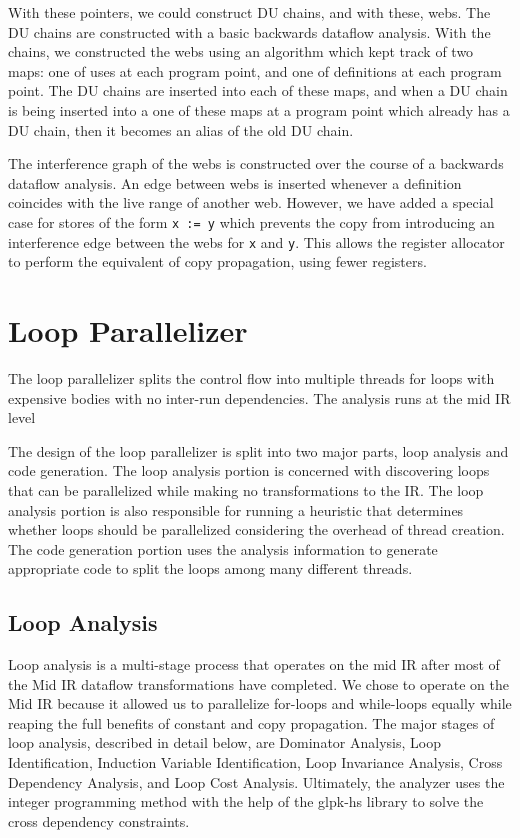 \documentclass[11pt]{article}
\begin{document}
With these pointers, we could construct DU chains, and with these,
webs.  The DU chains are constructed with a basic backwards dataflow
analysis.  With the chains, we constructed the webs using an algorithm
which kept track of two maps: one of uses at each program point, and
one of definitions at each program point.  The DU chains are inserted
into each of these maps, and when a DU chain is being inserted into a
one of these maps at a program point which already has a DU chain,
then it becomes an alias of the old DU chain.

The interference graph of the webs is constructed over the course of a
backwards dataflow analysis.  An edge between webs is inserted
whenever a definition coincides with the live range of another web.
However, we have added a special case for stores of the form \texttt{x
  := y} which prevents the copy from introducing an interference edge
between the webs for \texttt{x} and \texttt{y}.  This allows the
register allocator to perform the equivalent of copy propagation,
using fewer registers.

\section{Loop Parallelizer}
\label{sec:parallel}

The loop parallelizer splits the control flow into multiple threads
for loops with expensive bodies with no inter-run dependencies. The
analysis runs at the mid IR level 

The design of the loop parallelizer is split into two major parts,
loop analysis and code generation. The loop analysis portion is
concerned with discovering loops that can be parallelized while making
no transformations to the IR. The loop analysis portion is also
responsible for running a heuristic that determines whether loops
should be parallelized considering the overhead of thread
creation. The code generation portion uses the analysis information to 
generate appropriate code to split the loops among many different
threads.

\subsection { Loop Analysis } 

Loop analysis is a multi-stage process that operates on the mid IR
after most of the Mid IR dataflow transformations have completed. We
chose to operate on the Mid IR because it allowed us to parallelize
for-loops and while-loops equally while reaping the full benefits of
constant and copy propagation. The major stages of loop analysis,
described in detail below, are Dominator Analysis, Loop
Identification, Induction Variable Identification, Loop Invariance
Analysis, Cross Dependency Analysis, and Loop Cost
Analysis. Ultimately, the analyzer uses the integer programming method
with the help of the glpk-hs library to solve the cross dependency
constraints.
\end{document}
